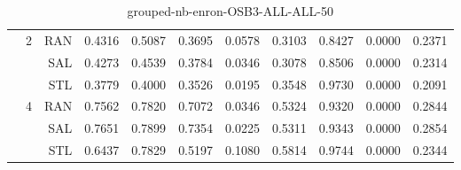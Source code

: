\begin{center}
\begin{table}[htbp]
\begin{center}
\begin{tabular}{ | r | r | r | r | r | r | r | r | r | r | r |}
 & \multirow{3}{*}{2} & RAN & 0.4316 & 0.5087 & 0.3695 & 0.0578 & 0.3103 & 0.8427 & 0.0000 & 0.2371\\ \cline{3-11}
 &   & SAL & 0.4273 & 0.4539 & 0.3784 & 0.0346 & 0.3078 & 0.8506 & 0.0000 & 0.2314\\ \cline{3-11}
 &   & STL & 0.3779 & 0.4000 & 0.3526 & 0.0195 & 0.3548 & 0.9730 & 0.0000 & 0.2091\\ \cline{2-11}
 & \multirow{3}{*}{4} & RAN & 0.7562 & 0.7820 & 0.7072 & 0.0346 & 0.5324 & 0.9320 & 0.0000 & 0.2844\\ \cline{3-11}
 &   & SAL & 0.7651 & 0.7899 & 0.7354 & 0.0225 & 0.5311 & 0.9343 & 0.0000 & 0.2854\\ \cline{3-11}
 &   & STL & 0.6437 & 0.7829 & 0.5197 & 0.1080 & 0.5814 & 0.9744 & 0.0000 & 0.2344\\ \cline{2-11}
\hline
\end{tabular}
\caption{grouped-nb-enron-OSB3-ALL-ALL-50}
\end{center}
 \end{table}
\end{center}

